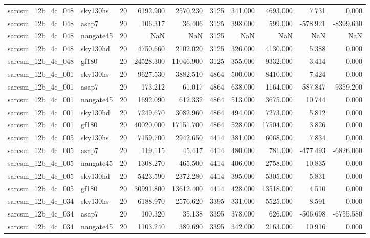 \documentclass{article}
\begin{document}
\begin{longtable}{llrrrrrrrr}
sarcsm\_12b\_4c\_048 & sky130hs & 20 & 6192.900 & 2570.230 & 3125 & 341.000 & 4693.000 & 7.731 & 0.000 \\
sarcsm\_12b\_4c\_048 & asap7 & 20 & 106.317 & 36.406 & 3125 & 398.000 & 599.000 & -578.921 & -8399.630 \\
sarcsm\_12b\_4c\_048 & nangate45 & 20 & NaN & NaN & 3125 & NaN & NaN & NaN & NaN \\
sarcsm\_12b\_4c\_048 & sky130hd & 20 & 4750.660 & 2102.020 & 3125 & 326.000 & 4130.000 & 5.388 & 0.000 \\
sarcsm\_12b\_4c\_048 & gf180 & 20 & 24528.300 & 11046.900 & 3125 & 355.000 & 9332.000 & 3.414 & 0.000 \\
sarcsm\_12b\_4c\_001 & sky130hs & 20 & 9627.530 & 3882.510 & 4864 & 500.000 & 8410.000 & 7.424 & 0.000 \\
sarcsm\_12b\_4c\_001 & asap7 & 20 & 173.212 & 61.017 & 4864 & 638.000 & 1164.000 & -587.847 & -9359.200 \\
sarcsm\_12b\_4c\_001 & nangate45 & 20 & 1692.090 & 612.332 & 4864 & 513.000 & 3675.000 & 10.744 & 0.000 \\
sarcsm\_12b\_4c\_001 & sky130hd & 20 & 7249.670 & 3082.960 & 4864 & 494.000 & 7273.000 & 5.812 & 0.000 \\
sarcsm\_12b\_4c\_001 & gf180 & 20 & 40020.000 & 17151.700 & 4864 & 528.000 & 17504.000 & 3.826 & 0.000 \\
sarcsm\_12b\_4c\_005 & sky130hs & 20 & 7159.700 & 2942.650 & 4414 & 381.000 & 6068.000 & 7.834 & 0.000 \\
sarcsm\_12b\_4c\_005 & asap7 & 20 & 119.115 & 45.417 & 4414 & 480.000 & 781.000 & -477.493 & -6826.060 \\
sarcsm\_12b\_4c\_005 & nangate45 & 20 & 1308.270 & 465.500 & 4414 & 406.000 & 2758.000 & 10.835 & 0.000 \\
sarcsm\_12b\_4c\_005 & sky130hd & 20 & 5423.590 & 2372.280 & 4414 & 395.000 & 5305.000 & 5.831 & 0.000 \\
sarcsm\_12b\_4c\_005 & gf180 & 20 & 30991.800 & 13612.400 & 4414 & 428.000 & 13518.000 & 4.510 & 0.000 \\
sarcsm\_12b\_4c\_034 & sky130hs & 20 & 6188.970 & 2576.620 & 3395 & 331.000 & 5525.000 & 8.591 & 0.000 \\
sarcsm\_12b\_4c\_034 & asap7 & 20 & 100.320 & 35.138 & 3395 & 378.000 & 626.000 & -506.698 & -6755.580 \\
sarcsm\_12b\_4c\_034 & nangate45 & 20 & 1103.240 & 389.690 & 3395 & 342.000 & 2163.000 & 10.916 & 0.000 \\

\end{longtable}
\end{document}
